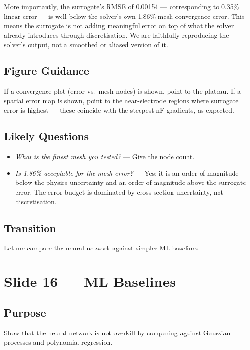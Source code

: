 \documentclass[12pt,a4paper]{article}
\begin{document}
More importantly, the surrogate's RMSE of 0.00154 --- corresponding
to 0.35\% linear error --- is well below the solver's own 1.86\%
mesh-convergence error. This means the surrogate is not adding
meaningful error on top of what the solver already introduces through
discretisation. We are faithfully reproducing the solver's output,
not a smoothed or aliased version of it.

\subsection*{Figure Guidance}
If a convergence plot (error vs.\ mesh nodes) is shown, point to the
plateau. If a spatial error map is shown, point to the
near-electrode regions where surrogate error is highest --- these
coincide with the steepest nF gradients, as expected.

\subsection*{Likely Questions}
\begin{itemize}
  \item \emph{What is the finest mesh you tested?}
    --- Give the node count.
  \item \emph{Is 1.86\% acceptable for the mesh error?}
    --- Yes; it is an order of magnitude below the physics uncertainty
    and an order of magnitude above the surrogate error. The error
    budget is dominated by cross-section uncertainty, not
    discretisation.
\end{itemize}

\subsection*{Transition}
Let me compare the neural network against simpler ML baselines.

\clearpage

\section{Slide 16 --- ML Baselines}
\label{sec:slide16}

\subsection*{Purpose}
Show that the neural network is not overkill by comparing against
Gaussian processes and polynomial regression.
\end{document}
